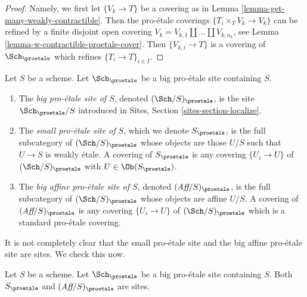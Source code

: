\begin{proof}
Namely, we first let $\{V_k \to T\}$ be a covering as in
Lemma \ref{lemma-get-many-weakly-contractible}.
Then the pro-\'etale coverings $\{T_i \times_T V_k \to V_k\}$
can be refined by a finite disjoint open covering
$V_k = V_{k, 1} \amalg \ldots \amalg V_{k, n_k}$, see
Lemma \ref{lemma-w-contractible-proetale-cover}.
Then $\{V_{k, i} \to T\}$ is a covering of $\Sch_\proetale$
which refines $\{T_i \to T\}_{i \in I}$.
\end{proof}

\begin{definition}
\label{definition-big-small-proetale}
Let $S$ be a scheme. Let $\Sch_\proetale$ be a big pro-\'etale
site containing $S$.
\begin{enumerate}
\item The {\it big pro-\'etale site of $S$}, denoted
$(\Sch/S)_\proetale$, is the site $\Sch_\proetale/S$
introduced in Sites, Section \ref{sites-section-localize}.
\item The {\it small pro-\'etale site of $S$}, which we denote
$S_\proetale$, is the full subcategory of $(\Sch/S)_\proetale$
whose objects are those $U/S$ such that $U \to S$ is weakly \'etale.
A covering of $S_\proetale$ is any covering $\{U_i \to U\}$ of
$(\Sch/S)_\proetale$ with $U \in \Ob(S_\proetale)$.
\item The {\it big affine pro-\'etale site of $S$}, denoted
$(\textit{Aff}/S)_\proetale$, is the full subcategory of
$(\Sch/S)_\proetale$ whose objects are affine $U/S$.
A covering of $(\textit{Aff}/S)_\proetale$ is any covering
$\{U_i \to U\}$ of $(\Sch/S)_\proetale$ which is a
standard pro-\'etale covering.
\end{enumerate}
\end{definition}

\noindent
It is not completely clear that the small pro-\'etale site and
the big affine pro-\'etale site are sites. We check this now.

\begin{lemma}
\label{lemma-verify-site-proetale}
Let $S$ be a scheme. Let $\Sch_\proetale$ be a big pro-\'etale site
containing $S$. Both $S_\proetale$ and $(\textit{Aff}/S)_\proetale$ are sites.
\end{lemma}

